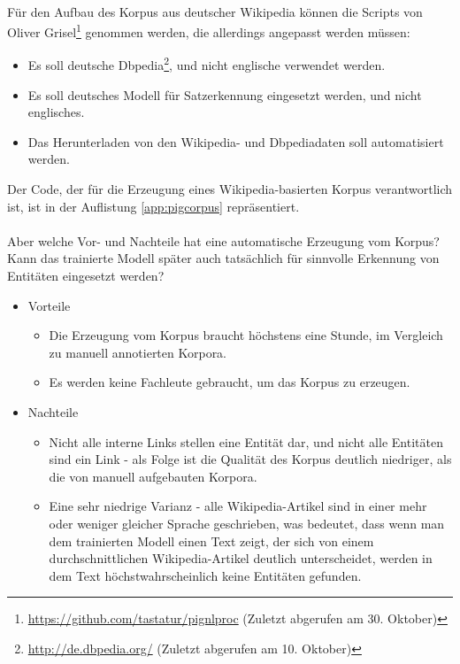 \paragraph{} 
Für den Aufbau des Korpus aus deutscher Wikipedia können die Scripts von Oliver Grisel\footnote{\url{https://github.com/tastatur/pignlproc} (Zuletzt abgerufen am 30. Oktober)} genommen werden, die allerdings angepasst werden müssen:
\begin{itemize}
\item Es soll deutsche Dbpedia\footnote{\url{http://de.dbpedia.org/} (Zuletzt abgerufen am 10. Oktober)}, und nicht englische verwendet werden.
\item Es soll deutsches Modell für Satzerkennung eingesetzt werden, und nicht englisches.
\item Das Herunterladen von den Wikipedia- und Dbpediadaten soll automatisiert werden.
\end{itemize}

Der Code, der für die Erzeugung eines Wikipedia-basierten Korpus verantwortlich ist, ist in der Auflistung \ref{app:pigcorpus} repräsentiert.

\paragraph{}
Aber welche Vor- und Nachteile hat eine automatische Erzeugung vom Korpus? Kann das trainierte Modell später auch tatsächlich für sinnvolle Erkennung von Entitäten eingesetzt werden?
\begin{itemize}
\item Vorteile
\begin{itemize}
\item Die Erzeugung vom Korpus braucht höchstens eine Stunde, im Vergleich zu manuell annotierten Korpora.
\item Es werden keine Fachleute gebraucht, um das Korpus zu erzeugen.
\end{itemize}
\item Nachteile
\begin{itemize}
\item Nicht alle interne Links stellen eine Entität dar, und nicht alle Entitäten sind ein Link - als Folge ist die Qualität des Korpus deutlich niedriger, als die von manuell aufgebauten Korpora.
\item Eine sehr niedrige Varianz - alle Wikipedia-Artikel sind in einer mehr oder weniger gleicher Sprache geschrieben, was bedeutet, dass wenn man dem trainierten Modell einen Text zeigt, der sich von einem durchschnittlichen Wikipedia-Artikel deutlich unterscheidet, werden in dem Text höchstwahrscheinlich keine Entitäten gefunden.
\end{itemize}
\end{itemize}

